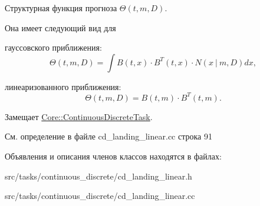 Структурная функция прогноза $\Theta(t,m,D)$. 

Она имеет следующий вид для


\begin{DoxyItemize}
\item гауссовского приближения\+: \[\Theta(t,m,D) = \int B(t,x)\cdot B^T(t,x)\cdot N(x\ |\ m,D)dx,\]
\item линеаризованного приближения\+: \[\Theta(t,m,D) = B(t,m)\cdot B^T(t,m).\] 
\end{DoxyItemize}

Замещает \hyperlink{class_core_1_1_continuous_discrete_task_a961cc49fd0c72ba0a211bb4913ca3ece}{Core\+::\+Continuous\+Discrete\+Task}.



См. определение в файле cd\+\_\+landing\+\_\+linear.\+cc строка 91



Объявления и описания членов классов находятся в файлах\+:\begin{DoxyCompactItemize}
\item 
src/tasks/continuous\+\_\+discrete/cd\+\_\+landing\+\_\+linear.\+h\item 
src/tasks/continuous\+\_\+discrete/cd\+\_\+landing\+\_\+linear.\+cc\end{DoxyCompactItemize}
